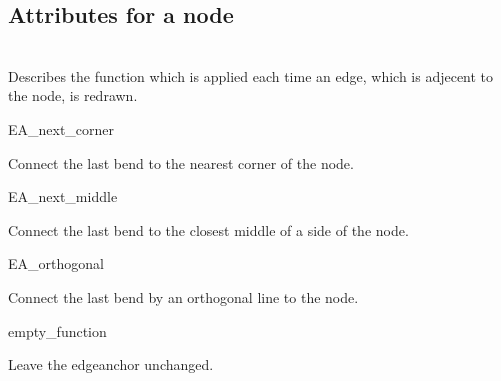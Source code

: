 \documentclass[twoside,fleqn]{report}
\begin{document}
\subsection{Attributes for a node}

\begin{TclAttributes}

   \strut\\
  Describes the function which is applied each time an edge, which is
  adjecent to the node, is redrawn. 
  \begin{ttdescription}
    \item[EA\_next\_corner] \strut 
    Connect the last bend to the nearest corner of the node.
    \item[EA\_next\_middle] \strut 
      Connect the last bend to the closest middle of a side of the node.
    \item[EA\_orthogonal] \strut
      Connect the last bend by an orthogonal line to the node.
    \item[empty\_function] \strut
      Leave the edgeanchor unchanged.
    \end{ttdescription}

\end{TclAttributes}
\end{document}
